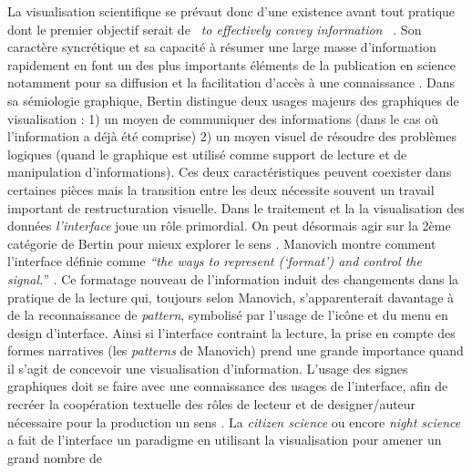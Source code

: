 La visualisation scientifique se pr\'evaut donc d{\textquoteright}une
existence avant tout pratique dont le premier objectif serait de
\textit{{\guillemotleft}~to effectively convey
information~{\guillemotright}} \cite{Kelleher2011}. Son
caract\`ere syncr\'etique et sa capacit\'e \`a r\'esumer une large
masse d{\textquoteright}information rapidement en font un des plus
importants \'el\'ements de la publication en science notamment pour sa
diffusion et la facilitation d{\textquoteright}acc\`es \`a une
connaissance \cite{Ware2004}. Dans sa s\'emiologie graphique, Bertin
\cite{Bertin1977} distingue deux usages majeurs des graphiques de visualisation :
1) un moyen de communiquer des informations (dans le cas o\`u
l{\textquoteright}information a d\'ej\`a \'et\'e comprise) 2) un moyen
visuel de r\'esoudre des probl\`emes logiques (quand le graphique est
utilis\'e comme support de lecture et de manipulation
d{\textquoteright}informations). Ces deux caract\'eristiques peuvent
coexister dans certaines pi\`eces mais la transition entre les deux
n\'ecessite souvent un travail important de restructuration visuelle.
Dans le traitement et la la visualisation des donn\'ees
\textit{l{\textquoteright}interface }joue un r\^ole primordial. On peut
d\'esormais agir sur la 2\`eme cat\'egorie de Bertin pour mieux
explorer le sens \cite{Weissberg2007}. Manovich montre comment
l{\textquoteright}interface d\'efinie comme
\textit{{\textquotedblleft}the ways to represent
({\textquoteleft}format{\textquoteright}) and control the
signal.}{\textquotedblright} \cite{Manovich2013}. Ce formatage nouveau de
l{\textquoteright}information induit des changements dans la pratique
de la lecture qui, toujours selon Manovich,
s{\textquoteright}apparenterait davantage \`a de la reconnaissance de
\textit{pattern}, symbolis\'e par l{\textquoteright}usage de
l{\textquoteright}ic\^one et du menu en design
d{\textquoteright}interface. Ainsi si l{\textquoteright}interface
contraint la lecture, la prise en compte des formes narratives (les
\textit{patterns} de Manovich) prend une grande importance quand il
s{\textquoteright}agit de concevoir une visualisation
d{\textquoteright}information. L{\textquoteright}usage des signes
graphiques doit se faire avec une connaissance des usages de
l{\textquoteright}interface, afin de recr\'eer la coop\'eration
textuelle des r\^oles de lecteur et de designer/auteur n\'ecessaire
pour la production un sens \cite{Eco1985}. La \textit{citizen science} ou
encore \textit{night science} a fait de l{\textquoteright}interface un
paradigme en utilisant la visualisation pour amener un grand nombre de
